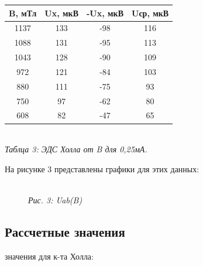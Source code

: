\begin{table} [h!]
    \begin{center}
    \begin{tabular}{|c|c|c|c|} \hline
        B, мТл & Ux, мкВ & -Ux, мкВ & Uср, мкВ \\ \hline
        1137 & 133  & -98  & 116 \\ \hline
        1088 & 131  & -95  & 113 \\ \hline
        1043 & 128  & -90  & 109 \\ \hline
        972  & 121  & -84  & 103 \\ \hline
        880  & 111  & -75  & 93  \\ \hline
        750  & 97   & -62  & 80  \\ \hline
        608  & 82   & -47  & 65  \\ \hline
    \end{tabular} \\ [0.2cm]
    \textit{Таблца 3: ЭДС Холла от B для 0,25мА.}
    \end{center}
\end{table}

На рисунке 3 представлены графики для этих данных:

\begin{figure}[h!]
    \\
    \textit{Рис. 3: Uab(B)}
\end{figure}

\newpage

\subsection{Рассчетные значения}

 значения для к-та Холла: \\

